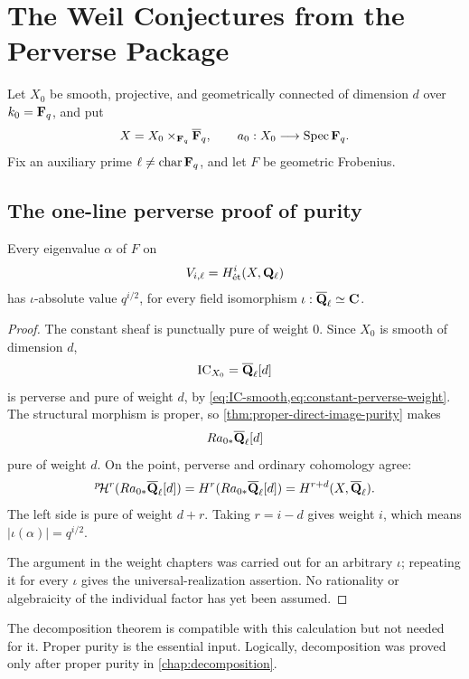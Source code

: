 \chapter{The Weil Conjectures from the Perverse Package}
\label{chap:weil-assembly}

Let \(X_0\) be smooth, projective, and geometrically connected of dimension
\(d\) over \(k_0=\mathbf F_q\), and put
\[
  X=X_0\times_{\mathbf F_q}\overline{\mathbf F}_q,\qquad
  a_0:X_0\longrightarrow\operatorname{Spec}\mathbf F_q.
\]
Fix an auxiliary prime \(\ell\ne\operatorname{char}\mathbf F_q\), and let \(F\) be
geometric Frobenius.

\section{The one-line perverse proof of purity}

\begin{theorem}
\label{thm:terminal-perverse-calculation}
Every eigenvalue \(\alpha\) of \(F\) on
\[
  V_{i,\ell}=H^i_{\mathrm{\acute et}}(X,\mathbf Q_\ell)
\]
has \(\iota\)-absolute value \(q^{i/2}\), for every field isomorphism
\(\iota:\overline{\mathbf Q}_\ell\simeq\mathbf C\).
\end{theorem}

\begin{proof}
The constant sheaf is punctually pure of weight \(0\).  Since \(X_0\) is
smooth of dimension \(d\),
\[
  \operatorname{IC}_{X_0}=\overline{\mathbf Q}_\ell[d]
\]
is perverse and pure of weight \(d\), by
\cref{eq:IC-smooth,eq:constant-perverse-weight}.  The structural morphism is
proper, so \cref{thm:proper-direct-image-purity} makes
\[
  Ra_{0*}\overline{\mathbf Q}_\ell[d]
\]
pure of weight \(d\).  On the point, perverse and ordinary cohomology agree:
\[
  {}^{p}\!\mathcal H^r(Ra_{0*}\overline{\mathbf Q}_\ell[d])
  =H^r(Ra_{0*}\overline{\mathbf Q}_\ell[d])
  =H^{r+d}(X,\overline{\mathbf Q}_\ell).
\]
The left side is pure of weight \(d+r\).  Taking \(r=i-d\) gives weight
\(i\), which means \(|\iota(\alpha)|=q^{i/2}\).

The argument in the weight chapters was carried out for an arbitrary
\(\iota\); repeating it for every \(\iota\) gives the universal-realization
assertion.  No rationality or algebraicity of the individual factor has yet
been assumed.
\end{proof}

\begin{perversebox}
The decomposition theorem is compatible with this calculation but not needed
for it.  Proper purity is the essential input.  Logically, decomposition was
proved only after proper purity in \cref{chap:decomposition}.
\end{perversebox}

